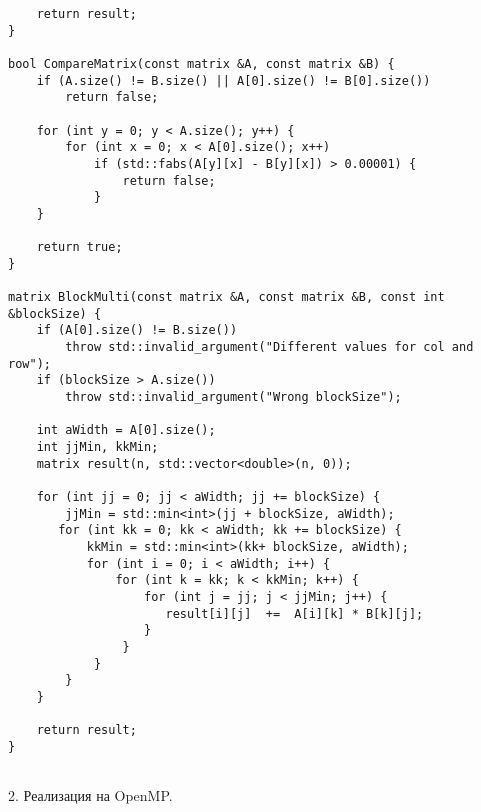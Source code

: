 \documentclass{report}
\begin{document}
\begin{lstlisting}
    return result;
}

bool CompareMatrix(const matrix &A, const matrix &B) {
    if (A.size() != B.size() || A[0].size() != B[0].size())
        return false;

    for (int y = 0; y < A.size(); y++) {
        for (int x = 0; x < A[0].size(); x++)
            if (std::fabs(A[y][x] - B[y][x]) > 0.00001) {
                return false;
            }
    }

    return true;
}

matrix BlockMulti(const matrix &A, const matrix &B, const int &blockSize) {
    if (A[0].size() != B.size())
        throw std::invalid_argument("Different values for col and row");
    if (blockSize > A.size())
        throw std::invalid_argument("Wrong blockSize");

    int aWidth = A[0].size();
    int jjMin, kkMin;
    matrix result(n, std::vector<double>(n, 0));

    for (int jj = 0; jj < aWidth; jj += blockSize) {
        jjMin = std::min<int>(jj + blockSize, aWidth);
       for (int kk = 0; kk < aWidth; kk += blockSize) {
           kkMin = std::min<int>(kk+ blockSize, aWidth);
           for (int i = 0; i < aWidth; i++) {
               for (int k = kk; k < kkMin; k++) {
                   for (int j = jj; j < jjMin; j++) {
                      result[i][j]  +=  A[i][k] * B[k][j];
                   }
                }
            }
        }
    }

    return result;
}


\end{lstlisting}
\par 2. Реализация на OpenMP.
\end{document}
